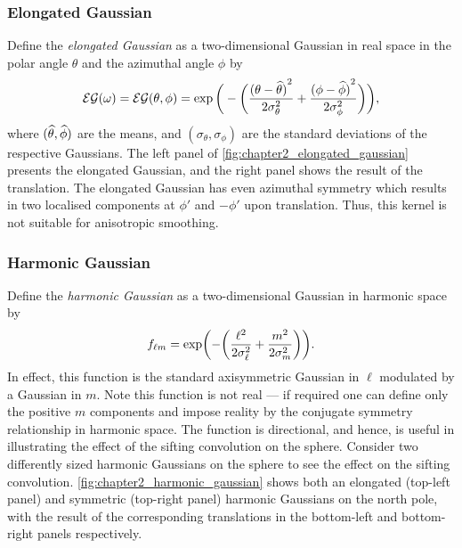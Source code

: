 

\subsubsection{Elongated Gaussian}

Define the \emph{elongated Gaussian} as a two-dimensional Gaussian in real space in the polar angle \(\theta{}\) and the azimuthal angle \(\phi{}\) by
%
\begin{equation}
	\mathcal{EG}(\omega)
	= \mathcal{EG}(\theta,\phi)
	= \exp\bigg(-\bigg(\frac{{(\theta-\widehat{\theta})}^{2}}{2\sigma_{\theta}^{2}}
		+ \frac{{(\phi-\widehat{\phi})}^{2}}{2\sigma_{\phi}^{2}}\bigg)\bigg),
\end{equation}
%
where \((\widehat{\theta},\widehat{\phi})\) are the means, and \((\sigma_{\theta},\sigma_{\phi})\) are the standard deviations of the respective Gaussians.
The left panel of \cref{fig:chapter2_elongated_gaussian} presents the elongated Gaussian, and the right panel shows the result of the translation.
The elongated Gaussian has even azimuthal symmetry which results in two localised components at \(\phi'\) and \(-\phi'\) upon translation.
Thus, this kernel is not suitable for anisotropic smoothing.



\subsubsection{Harmonic Gaussian}

Define the \emph{harmonic Gaussian} as a two-dimensional Gaussian in harmonic space by
%
\begin{equation}\label{eq:chapter2_harmonic_gaussian}
	{f}_{\ell m}
	= \exp(-\bigg(\frac{{\ell}^{2}}{2\sigma_{\ell}^{2}} + \frac{{m}^{2}}{2\sigma_{m}^{2}}\bigg)).
\end{equation}
%
In effect, this function is the standard axisymmetric Gaussian in \(\ell{}\) modulated by a Gaussian in \(m\).
Note this function is not real --- if required one can define only the positive \(m\) components and impose reality by the conjugate symmetry relationship in harmonic space.
The function is directional, and hence, is useful in illustrating the effect of the sifting convolution on the sphere.
Consider two differently sized harmonic Gaussians on the sphere to see the effect on the sifting convolution.
\cref{fig:chapter2_harmonic_gaussian} shows both an elongated (top-left panel) and symmetric (top-right panel) harmonic Gaussians on the north pole, with the result of the corresponding translations in the bottom-left and bottom-right panels respectively.

